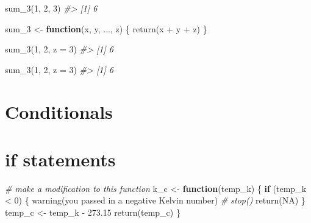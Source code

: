 \documentclass[
]{book}
\newenvironment{Shaded}{\begin{snugshade}}{\end{snugshade}}
\newcommand{\AttributeTok}[1]{\textcolor[rgb]{0.77,0.63,0.00}{#1}}
\newcommand{\CommentTok}[1]{\textcolor[rgb]{0.56,0.35,0.01}{\textit{#1}}}
\newcommand{\ConstantTok}[1]{\textcolor[rgb]{0.00,0.00,0.00}{#1}}
\newcommand{\ControlFlowTok}[1]{\textcolor[rgb]{0.13,0.29,0.53}{\textbf{#1}}}
\newcommand{\DecValTok}[1]{\textcolor[rgb]{0.00,0.00,0.81}{#1}}
\newcommand{\FloatTok}[1]{\textcolor[rgb]{0.00,0.00,0.81}{#1}}
\newcommand{\FunctionTok}[1]{\textcolor[rgb]{0.00,0.00,0.00}{#1}}
\newcommand{\NormalTok}[1]{#1}
\newcommand{\OtherTok}[1]{\textcolor[rgb]{0.56,0.35,0.01}{#1}}
\newcommand{\SpecialCharTok}[1]{\textcolor[rgb]{0.00,0.00,0.00}{#1}}
\newcommand{\StringTok}[1]{\textcolor[rgb]{0.31,0.60,0.02}{#1}}
\begin{document}
\begin{Shaded}
\begin{Highlighting}[]
\FunctionTok{sum\_3}\NormalTok{(}\DecValTok{1}\NormalTok{, }\DecValTok{2}\NormalTok{, }\DecValTok{3}\NormalTok{)}
\CommentTok{\#\textgreater{} [1] 6}
\end{Highlighting}
\end{Shaded}

\begin{Shaded}
\begin{Highlighting}[]
\NormalTok{sum\_3 }\OtherTok{\textless{}{-}} \ControlFlowTok{function}\NormalTok{(x, y, ..., z) \{}
  \FunctionTok{return}\NormalTok{(x }\SpecialCharTok{+}\NormalTok{ y }\SpecialCharTok{+}\NormalTok{ z)}
\NormalTok{\}}
\end{Highlighting}
\end{Shaded}

\begin{Shaded}
\begin{Highlighting}[]
\FunctionTok{sum\_3}\NormalTok{(}\DecValTok{1}\NormalTok{, }\DecValTok{2}\NormalTok{, }\AttributeTok{z =} \DecValTok{3}\NormalTok{)}
\CommentTok{\#\textgreater{} [1] 6}
\end{Highlighting}
\end{Shaded}

\begin{Shaded}
\begin{Highlighting}[]
\FunctionTok{sum\_3}\NormalTok{(}\DecValTok{1}\NormalTok{, }\DecValTok{2}\NormalTok{, }\AttributeTok{z =} \DecValTok{3}\NormalTok{)}
\CommentTok{\#\textgreater{} [1] 6}
\end{Highlighting}
\end{Shaded}

\hypertarget{conditionals}{%
\section{Conditionals}\label{conditionals}}

\hypertarget{if-statements}{%
\section{if statements}\label{if-statements}}

\begin{Shaded}
\begin{Highlighting}[]
\CommentTok{\# make a modification to this function}
\NormalTok{k\_c }\OtherTok{\textless{}{-}} \ControlFlowTok{function}\NormalTok{(temp\_k) \{}
    \ControlFlowTok{if}\NormalTok{ (temp\_k }\SpecialCharTok{\textless{}} \DecValTok{0}\NormalTok{) \{}
        \FunctionTok{warning}\NormalTok{(}\StringTok{\textquotesingle{}you passed in a negative Kelvin number\textquotesingle{}}\NormalTok{)}
        \CommentTok{\# stop()}
        \FunctionTok{return}\NormalTok{(}\ConstantTok{NA}\NormalTok{)}
\NormalTok{    \}}
\NormalTok{    temp\_c }\OtherTok{\textless{}{-}}\NormalTok{ temp\_k }\SpecialCharTok{{-}} \FloatTok{273.15}
    \FunctionTok{return}\NormalTok{(temp\_c)}
\NormalTok{\}}
\end{Highlighting}
\end{Shaded}
\end{document}
